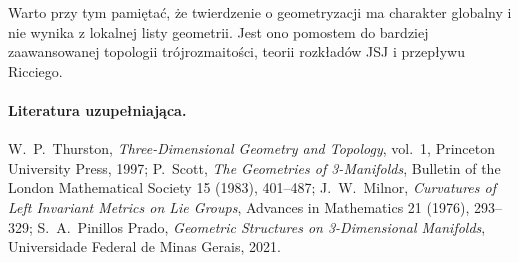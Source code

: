 Warto przy tym pamiętać, że twierdzenie o geometryzacji
ma charakter globalny i nie wynika z lokalnej listy geometrii.
Jest ono pomostem do bardziej zaawansowanej topologii
trójrozmaitości, teorii rozkładów JSJ i przepływu Ricciego.

\paragraph{Literatura uzupełniająca.}
W.~P.~Thurston, \emph{Three-Dimensional Geometry and Topology},
vol.~1, Princeton University Press, 1997;
P.~Scott, \emph{The Geometries of 3-Manifolds},
Bulletin of the London Mathematical Society 15 (1983), 401--487;
J.~W.~Milnor, \emph{Curvatures of Left Invariant Metrics on Lie Groups},
Advances in Mathematics 21 (1976), 293--329;
S.~A.~Pinillos Prado, \emph{Geometric Structures on 3-Dimensional
Manifolds}, Universidade Federal de Minas Gerais, 2021.
